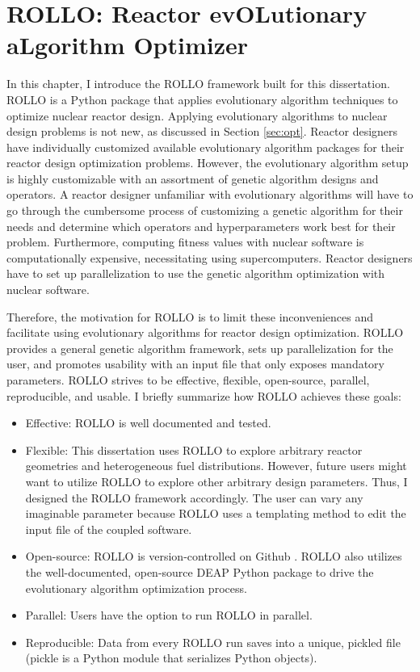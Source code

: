 \chapter{ROLLO: Reactor evOLutionary aLgorithm Optimizer}
\label{chap:rollo}
In this chapter, I introduce the \gls{ROLLO} framework built 
for this dissertation. 
\gls{ROLLO} is a Python package that applies evolutionary algorithm 
techniques to optimize nuclear reactor design. 
Applying evolutionary algorithms to nuclear design problems is not new, as
discussed in Section \ref{sec:opt}. 
Reactor designers have individually customized available evolutionary algorithm 
packages for their reactor design optimization problems.
However, the evolutionary algorithm setup is highly customizable with
an assortment of genetic algorithm designs and operators.
A reactor designer unfamiliar with evolutionary algorithms will have
to go through the cumbersome process of customizing a genetic algorithm 
for their needs and determine which operators and hyperparameters work best for 
their problem. 
Furthermore, computing fitness values with nuclear software is computationally 
expensive, necessitating using supercomputers. 
Reactor designers have to set up parallelization to use the genetic algorithm 
optimization with nuclear software.

Therefore, the motivation for \gls{ROLLO} is to limit these inconveniences and 
facilitate using evolutionary algorithms for reactor design optimization.
\gls{ROLLO} provides a general genetic algorithm framework, sets up 
parallelization for the user, and promotes usability with an input file 
that only exposes mandatory parameters.
\gls{ROLLO} strives to be effective, flexible, open-source, parallel, reproducible, 
and usable. 
I briefly summarize how \gls{ROLLO} achieves these goals:  
\begin{itemize}
    \item Effective: \gls{ROLLO} is well documented and tested.
    \item Flexible: This dissertation uses \gls{ROLLO} to 
    explore arbitrary reactor geometries and heterogeneous fuel distributions. 
    However, future users might want to utilize \gls{ROLLO} 
    to explore other arbitrary design parameters. Thus, I designed the \gls{ROLLO}
    framework accordingly. The user can vary any imaginable parameter 
    because \gls{ROLLO} uses a templating method to edit the input file of the 
    coupled software.
    \item Open-source: \gls{ROLLO} is version-controlled on Github 
    \cite{chee_rollo_2021}. \gls{ROLLO} also utilizes the well-documented, open-source 
    \gls{DEAP} \cite{fortin_deap_2012} Python package to drive the evolutionary 
    algorithm optimization process.
    \item Parallel: Users have the option to run \gls{ROLLO} in parallel.
    \item Reproducible: Data from every \gls{ROLLO} run saves into a unique, pickled 
    file (pickle is a Python module that serializes Python objects).
\end{itemize}

